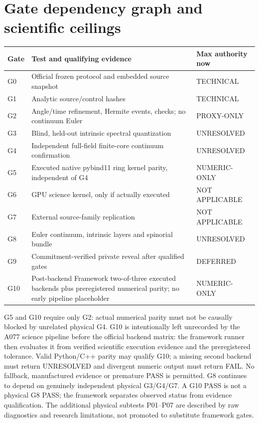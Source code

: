 \documentclass[10pt,a4paper]{article}
\begin{document}
\section{Gate dependency graph and scientific ceilings}
\small\begin{longtable}{p{.12\linewidth}p{.62\linewidth}p{.18\linewidth}}\toprule Gate & Test and qualifying evidence & Max authority now\\\midrule\endhead
G0 & Official frozen protocol and embedded source snapshot & TECHNICAL\\
G1 & Analytic source/control hashes & TECHNICAL\\
G2 & Angle/time refinement, Hermite events, checks; no continuum Euler & PROXY-ONLY\\
G3 & Blind, held-out intrinsic spectral quantization & UNRESOLVED\\
G4 & Independent full-field finite-core continuum confirmation & UNRESOLVED\\
G5 & Executed native pybind11 ring kernel parity, independent of G4 & NUMERIC-ONLY\\
G6 & GPU science kernel, only if actually executed & NOT APPLICABLE\\
G7 & External source-family replication & NOT APPLICABLE\\
G8 & Euler continuum, intrinsic layers and spinorial bundle & UNRESOLVED\\
G9 & Commitment-verified private reveal after qualified gates & DEFERRED\\
G10 & Post-backend Framework two-of-three executed backends plus preregistered numerical parity; no early pipeline placeholder & NUMERIC-ONLY\\\bottomrule\end{longtable}\normalsize
G5 and G10 require only G2: actual numerical parity must not be causally blocked by unrelated physical G4. G10 is intentionally left unrecorded by the A077 science pipeline before the official backend matrix: the framework runner then evaluates it from verified scientific execution evidence and the preregistered tolerance. Valid Python/C++ parity may qualify G10; a missing second backend must return UNRESOLVED and divergent numeric output must return FAIL. No fallback, manufactured evidence or premature PASS is permitted. G8 continues to depend on genuinely independent physical G3/G4/G7. A G10 PASS is not a physical G8 PASS; the framework separates observed status from evidence qualification. The additional physical subtests P01--P07 are described by raw diagnostics and research limitations, not promoted to substitute framework gates.
\end{document}
